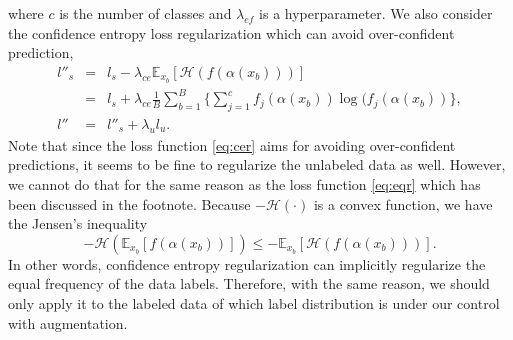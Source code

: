 where $c$ is the number of classes and $\lambda_{ef}$ is a hyperparameter. We also consider the confidence entropy loss regularization which can avoid over-confident prediction,
\begin{eqnarray}
l''_s &=& l_s - \lambda_{ce} \mathbb{E}_{x_b}[\mathcal{H}(f(\alpha(x_b)))] \nonumber \\
&=&  l_s + \lambda_{ce}
\frac{1}{B}
\sum_{b=1}^B\{
\sum_{j=1}^c f_j(\alpha(x_b)) \log (f_j(\alpha(x_b))\}, \nonumber \\
l'' &=& l''_s + \lambda_u l_u.\label{eq:cer}
\end{eqnarray}
Note that since the loss function \eqref{eq:cer} aims for avoiding over-confident predictions, it seems to be fine to regularize the unlabeled data as well. However, we cannot do that for the same reason as the loss function \eqref{eq:eqr} which has been discussed in the footnote. Because 
$-\mathcal{H}(\cdot)$ is a convex function, we have the Jensen's inequality
$$- \mathcal{H}(\mathbb{E}_{x_b}[f(\alpha(x_b))]) \leq - \mathbb{E}_{x_b}[\mathcal{H}(f(\alpha(x_b)))].$$
In other words, confidence entropy regularization can implicitly regularize the equal frequency of the data labels.
Therefore, with the same reason, we should only apply it to the labeled data of which label distribution is under our control with augmentation.